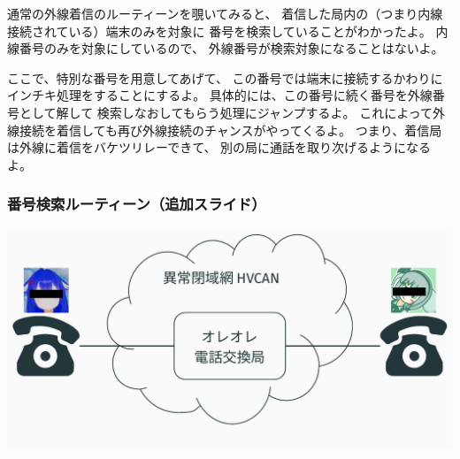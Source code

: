 \documentclass[
  lualatex,
  aspectratio=169,
  14pt
]{beamer}
\begin{document}
\begin{frame}
{    通常の外線着信のルーティーンを覗いてみると、
    着信した局内の（つまり内線接続されている）端末のみを対象に
    番号を検索していることがわかったよ。
    内線番号のみを対象にしているので、
    外線番号が検索対象になることはないよ。

    ここで、特別な番号を用意してあげて、
    この番号では端末に接続するかわりにインチキ処理をすることにするよ。
    具体的には、この番号に続く番号を外線番号として解して
    検索しなおしてもらう処理にジャンプするよ。
    これによって外線接続を着信しても再び外線接続のチャンスがやってくるよ。
    つまり、着信局は外線に着信をバケツリレーできて、
    別の局に通話を取り次げるようになるよ。
  }
\end{frame}

\begin{frame}
  \frametitle{番号検索ルーティーン（追加スライド）}

  \includegraphics[page=9,width=\linewidth]{./images/pictures.pdf}
\end{frame}
\end{document}
